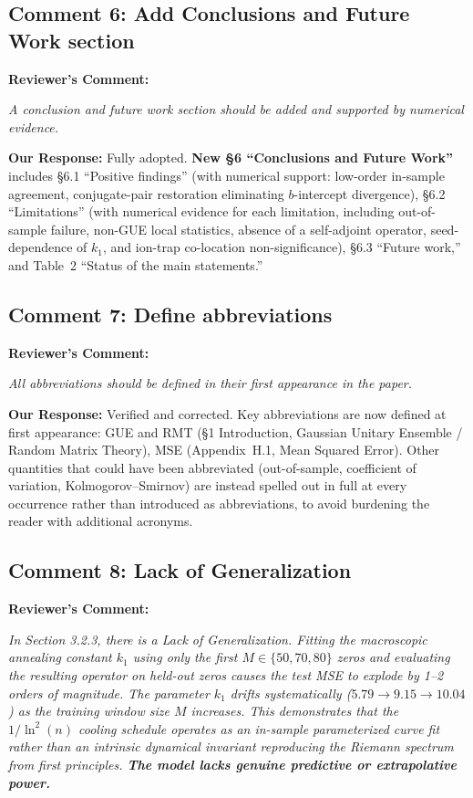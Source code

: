 \documentclass[11pt]{article}
\begin{document}
\subsection*{Comment 6: Add Conclusions and Future Work section}

\noindent\textbf{Reviewer's Comment:}
\begin{quotebox}
\itshape A conclusion and future work section should be added and supported by numerical evidence.
\end{quotebox}

\noindent\textbf{Our Response:} Fully adopted. \textbf{New \S6 ``Conclusions and Future Work''} includes \S6.1 ``Positive findings'' (with numerical support: low-order in-sample agreement, conjugate-pair restoration eliminating $b$-intercept divergence), \S6.2 ``Limitations'' (with numerical evidence for each limitation, including out-of-sample failure, non-GUE local statistics, absence of a self-adjoint operator, seed-dependence of $k_1$, and ion-trap co-location non-significance), \S6.3 ``Future work,'' and Table~2 ``Status of the main statements.''

\subsection*{Comment 7: Define abbreviations}

\noindent\textbf{Reviewer's Comment:}
\begin{quotebox}
\itshape All abbreviations should be defined in their first appearance in the paper.
\end{quotebox}

\noindent\textbf{Our Response:} Verified and corrected. Key abbreviations are now defined at first appearance: GUE and RMT (\S1 Introduction, Gaussian Unitary Ensemble / Random Matrix Theory), MSE (Appendix~H.1, Mean Squared Error). Other quantities that could have been abbreviated (out-of-sample, coefficient of variation, Kolmogorov--Smirnov) are instead spelled out in full at every occurrence rather than introduced as abbreviations, to avoid burdening the reader with additional acronyms.

\subsection*{Comment 8: Lack of Generalization}

\noindent\textbf{Reviewer's Comment:}
\begin{quotebox}
\itshape In Section 3.2.3, there is a Lack of Generalization. Fitting the macroscopic annealing constant $k_1$ using only the first $M \in \{50, 70, 80\}$ zeros and evaluating the resulting operator on held-out zeros causes the test MSE to explode by 1--2 orders of magnitude. The parameter $k_1$ drifts systematically ($5.79 \to 9.15 \to 10.04$) as the training window size $M$ increases. This demonstrates that the $1/\ln^2(n)$ cooling schedule operates as an in-sample parameterized curve fit rather than an intrinsic dynamical invariant reproducing the Riemann spectrum from first principles. \textbf{The model lacks genuine predictive or extrapolative power.}
\end{quotebox}
\end{document}

